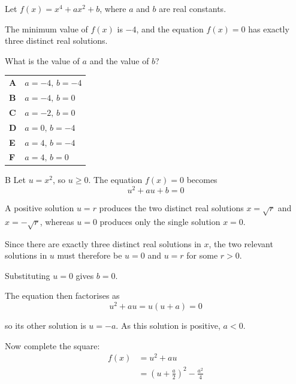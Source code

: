 \documentclass[11pt,a4paper]{article}
\begin{document}
\begin{enumerate}[label=\textbf{\arabic*.},leftmargin=*,itemsep=0pt,start=18]
\questionitem[Polynomials]
Let $f(x)=x^4+ax^2+b$, where $a$ and $b$ are real constants.

The minimum value of $f(x)$ is $-4$, and the equation $f(x)=0$ has exactly three distinct real solutions.

What is the value of $a$ and the value of $b$?

\par\vspace*{12pt}
\begin{tabularx}{\linewidth}{@{}>{\bfseries}l Y@{}}
A &
$a=-4,\,b=-4$
\\[0.8em]
B &
$a=-4,\,b=0$
\\[0.8em]
C &
$a=-2,\,b=0$
\\[0.8em]
D &
$a=0,\,b=-4$
\\[0.8em]
E &
$a=4,\,b=-4$
\\[0.8em]
F &
$a=4,\,b=0$
\\
\end{tabularx}

\begin{djsSolution}{B}
Let $u=x^2$, so $u\geq 0$. The equation $f(x)=0$ becomes
\[
u^2+au+b=0
\]

A positive solution $u=r$ produces the two distinct real solutions $x=\sqrt r$ and $x=-\sqrt r$, whereas $u=0$ produces only the single solution $x=0$. 

Since there are exactly three distinct real solutions in $x$, the two relevant solutions in $u$ must therefore be $u=0$ and $u=r$ for some $r>0$.

Substituting $u=0$ gives $b=0$. 

The equation then factorises as
\[
u^2+au=u(u+a)=0
\]

so its other solution is $u=-a$. As this solution is positive, $a<0$.

Now complete the square:
\begin{align*}
    f(x)&=u^2+au\\[5pt]
    &=\left(u+\frac a2\right)^2-\frac{a^2}{4}
\end{align*}


\end{djsSolution}
\end{enumerate}
\end{document}

